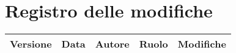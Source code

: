 \documentclass[./PianodiProgetto.tex]{subfiles}
\begin{document}
\chapter*{Registro delle modifiche}
\begin{center}	
	\begin{tabular}{|c|c|c|c|p{4cm}|}
		\hline
		\textbf{Versione} & \textbf{Data} & \textbf{Autore} & \textbf{Ruolo} & \textbf{Modifiche} \\ \hline
		
	\end{tabular}
\end{center}	
\end{document}
